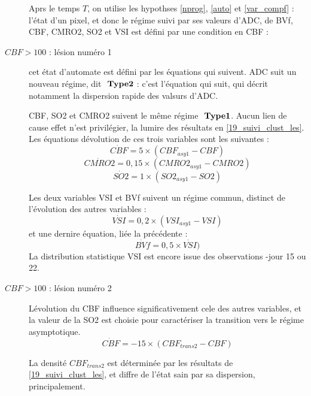 \begin{description}
Aprs le temps $T$, on utilise les hypothses \ref{nprog}, \ref{auto} et \ref{var_compf} : %
l'\'etat d'un pixel, et donc le r\'egime suivi par ses valeurs d'ADC, de BVf, CBF, CMRO2, SO2 et VSI est d\'efini par une condition en CBF :
%
\item[$CBF > 100$ : l\'esion num\'ero 1 ] cet \'etat d'automate est d\'efini par les \'equations qui suivent.
ADC suit un nouveau r\'egime, dit $\ \mathbf{Type 2}$ : c'est l'\'equation qui suit, qui d\'ecrit notamment la dispersion rapide des valsurs d'ADC.

CBF, SO2 et CMRO2 suivent le m\^eme r\'egime $\ \mathbf{Type 1}$. Aucun lien de cause  effet n'est  privil\'egier,  la lumire des r\'esultats en \ref{19_suivi_clust_les}. %
Les \'equations d\'evolution de ces trois variables sont les suivantes :
\begin{equation}
\dot{CBF}=5\times\left(CBF_{asy1}-CBF\right)
\end{equation}
\begin{equation}
\dot{CMRO2}=0,15\times\left(CMRO2_{asy1}-CMRO2\right)
\end{equation}
\begin{equation}
\dot{SO2}=1\times\left(SO2_{asy1}-SO2\right)
\end{equation}

Les deux variables VSI et BVf suivent un r\'egime commun, distinct de l'\'evolution des autres variables :
\begin{equation}
\dot{VSI}=0,2\times (VSI_{asy1}-VSI)
\end{equation}
et une dernire \'equation, li\'ee  la pr\'ec\'edente :
\begin{equation}
\dot{BVf}=0,5\times\dot{VSI})
\end{equation}
La distribution statistique VSI est encore issue des observations -jour 15 ou 22.
%
\item[$CBF > 100$ : l\'esion num\'ero 2 ] L\'evolution du CBF influence significativement cele des autres variables, %
et la valeur de la SO2 est choisie pour caract\'eriser la transition vers le r\'egime asymptotique.
\begin{equation}
\dot{CBF}=-15\times\left(CBF_{trans2}-CBF\right)
\end{equation}

La densit\'e $CBF_{trans2}$ est d\'etermin\'ee par les r\'esultats de \ref{19_suivi_clust_les}, %
et diffre de l'\'etat sain par sa dispersion, principalement.


\end{description}
